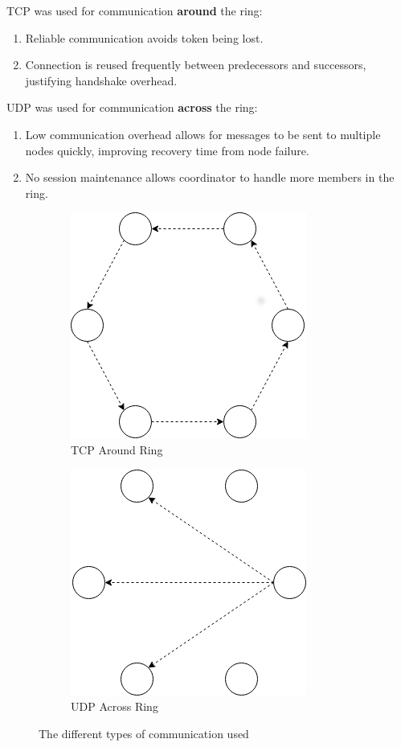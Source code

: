 \documentclass[12pt]{article}
\begin{document}
\linebreak
\noindent TCP was used for communication \textbf{around} the ring:
\begin{enumerate}
    \item Reliable communication avoids token being lost.
    \item Connection is reused frequently between predecessors and successors, justifying handshake overhead.
\end{enumerate}

\noindent UDP was used for communication \textbf{across} the ring: 
\begin{enumerate}
    \item Low communication overhead allows for messages to be sent to multiple nodes quickly, improving recovery time from node failure.
    \item No session maintenance allows coordinator to handle more members in the ring.
\end{enumerate}

\begin{figure}[!h]
\centering
\begin{subfigure}{.5\textwidth}
  \centering
  \includegraphics[width=.6\linewidth]{images/tcp}
  \caption{TCP Around Ring}
  \label{fig:tcp}
\end{subfigure}%
\begin{subfigure}{.5\textwidth}
  \centering
  \includegraphics[width=.6\linewidth]{images/udp}
  \caption{UDP Across Ring}
  \label{fig:udp}
\end{subfigure}
\caption{The different types of communication used}
\label{fig:pattern}
\end{figure}
\end{document}
